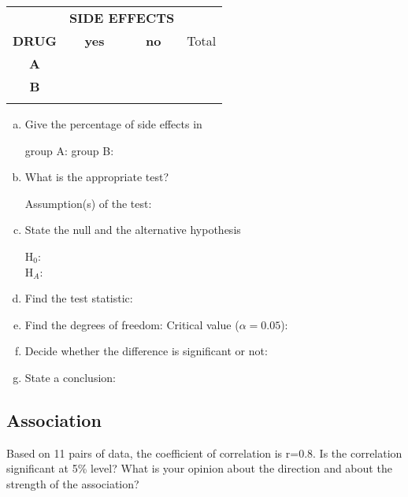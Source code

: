 	\begin{tabular}{c|cc|c}
	\toprule
		&\multicolumn{2}{c|}{\textbf{SIDE EFFECTS}}\\
	\textbf{DRUG}	&\textbf{yes}	&\textbf{no}	&{\color{white} Total}\\
	\midrule
	\textbf{A}	&	&	&\\
	\textbf{B}	&	&	&\\
	\midrule
				&		&\\
	\bottomrule
	\end{tabular}
\begin{enumerate}[a)]
	\item Give the percentage of side effects in 
	
		group A: \hrulefill\quad group B:  \hrulefill
	\item What is the appropriate test? 
	
		\hrulefill 
		

			Assumption(s) of the test:
		
		\hrulefill
	\item State the null and the alternative hypothesis
	
	H$_0$: 	\hrulefill 	\\
	H$_A$: \hrulefill 	
	
\item
	Find the test statistic: \hrulefill
	
\item
	Find the degrees of freedom: 	\hrulefill \quad Critical value ($\alpha=0.05$): \hrulefill 	


	\item Decide whether the difference is significant or not:\\
	
	 \hrulefill 	
	
	\item
	State a conclusion:
	
	 \hrulefill 	
	
	
	\end{enumerate}
	
	
\subsection{Association}
Based on 11 pairs of data, the coefficient of correlation is r=0.8. Is the correlation significant at 5\% level? What is your opinion about the direction and about the strength of the association? 	


